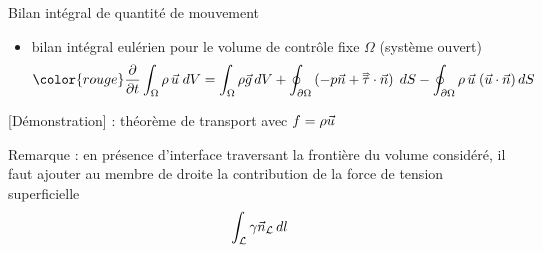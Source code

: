 \begin{frame}{Bilan intégral de quantité de mouvement }
\begin{itemize}
\smallskip

\pause
\item
  bilan intégral eulérien pour le volume de contrôle fixe $\Omega$ (système ouvert)
	\begin{equation}
		\color{rouge}
		\dpdt{} \int_{\Omega} \rho \, \myvec{u} \; dV 
		=
		\int_{\Omega} \rho \myvec{g} \, dV 
		+ \oint_{\partial \Omega} \left( -p \myvec{n} + \mytensor{\tau} \cdot \myvec{n}\right) \; dS
		- \oint_{\partial \Omega} \rho \, \myvec{u}\; (\myvec{u}\cdot \myvec{n}) \, dS
		\label{eq:bilan_global_eulerien_qdm}
	\end{equation}
\end{itemize}

{\color{vert} [Démonstration] :} théorème de transport avec $f= \rho \vec{u}$

\medskip
\pause

\color{gris} Remarque : en présence d'interface traversant la frontière du volume considéré, il faut ajouter au membre de droite la contribution de la force de tension superficielle
$$
\int_{\mathcal{L}} \gamma \vec{n}_{\cal L} \, dl
$$


\end{frame}
%
%
%
%
